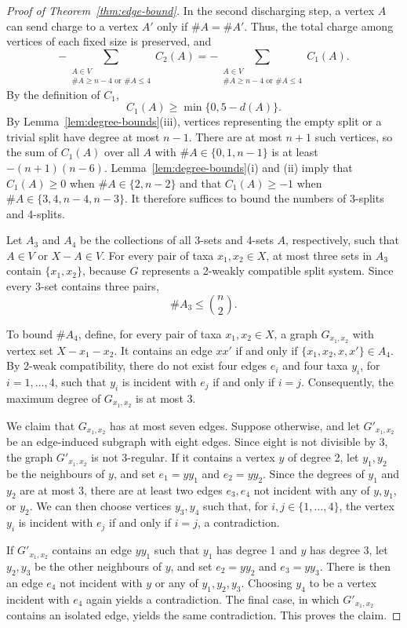 \documentclass[11pt]{article}
\newcommand{\cA}{A}
\begin{document}
	\begin{proof}[Proof of Theorem~\ref{thm:edge-bound}]
		In the second discharging step, a vertex $A$ can send charge to a vertex $A'$ only if $\#A=\#A'$. Thus, the total charge among vertices of each fixed size is preserved, and
		\[
		-\sum_{\substack{A\in V\\ \#A\ge n-4\text{ or }\#A\le 4}}C_2(A)
		=
		-\sum_{\substack{A\in V\\ \#A\ge n-4\text{ or }\#A\le 4}}C_1(A).
		\]
		By the definition of $C_1$,
		\[
		C_1(A)\ge \min\{0,5-d(A)\}.
		\]
		By Lemma~\ref{lem:degree-bounds}(iii), vertices representing the empty split or a trivial split have degree at most $n-1$. There are at most $n+1$ such vertices, so the sum of $C_1(A)$ over all $A$ with $\#A\in\{0,1,n-1\}$ is at least $-(n+1)(n-6)$. Lemma~\ref{lem:degree-bounds}(i) and (ii) imply that $C_1(A)\ge 0$ when $\#A\in\{2,n-2\}$ and that $C_1(A)\ge -1$ when $\#A\in\{3,4,n-4,n-3\}$. It therefore suffices to bound the numbers of 3-splits and 4-splits.
		
		Let $\cA_3$ and $\cA_4$ be the collections of all 3-sets and 4-sets $A$, respectively, such that $A\in V$ or $X-A\in V$. For every pair of taxa $x_1,x_2\in X$, at most three sets in $\cA_3$ contain $\{x_1,x_2\}$, because $G$ represents a 2-weakly compatible split system. Since every 3-set contains three pairs,
		\[
		\#\cA_3\le\binom{n}{2}.
		\]
		
		To bound $\#\cA_4$, define, for every pair of taxa $x_1,x_2\in X$, a graph $G_{x_1,x_2}$ with vertex set $X-x_1-x_2$. It contains an edge $xx'$ if and only if $\{x_1,x_2,x,x'\}\in\cA_4$. By 2-weak compatibility, there do not exist four edges $e_i$ and four taxa $y_i$, for $i=1,\ldots,4$, such that $y_i$ is incident with $e_j$ if and only if $i=j$. Consequently, the maximum degree of $G_{x_1,x_2}$ is at most 3.
		
		We claim that $G_{x_1,x_2}$ has at most seven edges. Suppose otherwise, and let $G'_{x_1,x_2}$ be an edge-induced subgraph with eight edges. Since eight is not divisible by 3, the graph $G'_{x_1,x_2}$ is not 3-regular. If it contains a vertex $y$ of degree 2, let $y_1,y_2$ be the neighbours of $y$, and set $e_1=yy_1$ and $e_2=yy_2$. Since the degrees of $y_1$ and $y_2$ are at most 3, there are at least two edges $e_3,e_4$ not incident with any of $y,y_1$, or $y_2$. We can then choose vertices $y_3,y_4$ such that, for $i,j\in\{1,\ldots,4\}$, the vertex $y_i$ is incident with $e_j$ if and only if $i=j$, a contradiction.
		
		If $G'_{x_1,x_2}$ contains an edge $yy_1$ such that $y_1$ has degree 1 and $y$ has degree 3, let $y_2,y_3$ be the other neighbours of $y$, and set $e_2=yy_2$ and $e_3=yy_3$. There is then an edge $e_4$ not incident with $y$ or any of $y_1,y_2,y_3$. Choosing $y_4$ to be a vertex incident with $e_4$ again yields a contradiction. The final case, in which $G'_{x_1,x_2}$ contains an isolated edge, yields the same contradiction. This proves the claim.
		

\end{proof}
\end{document}
